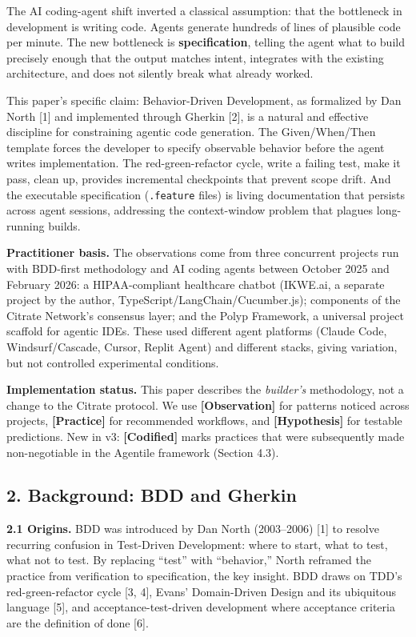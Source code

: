 The AI coding-agent shift inverted a classical assumption: that the
bottleneck in development is writing code. Agents generate hundreds of
lines of plausible code per minute. The new bottleneck is
\textbf{specification}, telling the agent what to build precisely enough
that the output matches intent, integrates with the existing
architecture, and does not silently break what already worked.

This paper's specific claim: Behavior-Driven Development, as formalized
by Dan North {[}1{]} and implemented through Gherkin {[}2{]}, is a
natural and effective discipline for constraining agentic code
generation. The Given/When/Then template forces the developer to specify
observable behavior before the agent writes implementation. The
red-green-refactor cycle, write a failing test, make it pass, clean up,
provides incremental checkpoints that prevent scope drift. And the
executable specification (\texttt{.feature} files) is living
documentation that persists across agent sessions, addressing the
context-window problem that plagues long-running builds.

\textbf{Practitioner basis.} The observations come from three concurrent
projects run with BDD-first methodology and AI coding agents between
October 2025 and February 2026: a HIPAA-compliant healthcare chatbot
(IKWE.ai, a separate project by the author,
TypeScript/LangChain/Cucumber.js); components of the Citrate Network's
consensus layer; and the Polyp Framework, a universal project scaffold
for agentic IDEs. These used different agent platforms (Claude Code,
Windsurf/Cascade, Cursor, Replit Agent) and different stacks, giving
variation, but not controlled experimental conditions.

\textbf{Implementation status.} This paper describes the
\emph{builder's} methodology, not a change to the Citrate protocol. We
use \textbf{{[}Observation{]}} for patterns noticed across projects,
\textbf{{[}Practice{]}} for recommended workflows, and
\textbf{{[}Hypothesis{]}} for testable predictions. New in v3:
\textbf{{[}Codified{]}} marks practices that were subsequently made
non-negotiable in the Agentile framework (Section 4.3).

\subsection{2. Background: BDD and
Gherkin}\label{background-bdd-and-gherkin}

\textbf{2.1 Origins.} BDD was introduced by Dan North (2003--2006)
{[}1{]} to resolve recurring confusion in Test-Driven Development: where
to start, what to test, what not to test. By replacing ``test'' with
``behavior,'' North reframed the practice from verification to
specification, the key insight. BDD draws on TDD's red-green-refactor
cycle {[}3, 4{]}, Evans' Domain-Driven Design and its ubiquitous
language {[}5{]}, and acceptance-test-driven development where
acceptance criteria are the definition of done {[}6{]}.


